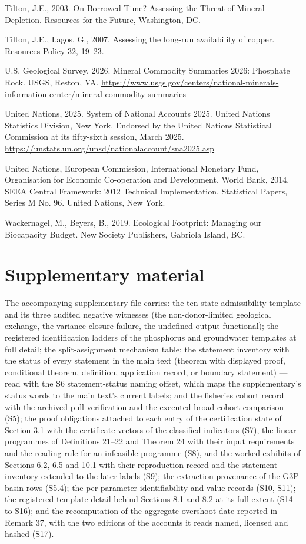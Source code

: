 \documentclass[11pt]{article}
\begin{document}
Tilton, J.E., 2003. On Borrowed Time? Assessing the Threat of Mineral Depletion. Resources for the Future, Washington, DC.

Tilton, J.E., Lagos, G., 2007. Assessing the long-run availability of copper. Resources Policy 32, 19--23.

U.S. Geological Survey, 2026. Mineral Commodity Summaries 2026: Phosphate Rock. USGS, Reston, VA. \url{https://www.usgs.gov/centers/national-minerals-information-center/mineral-commodity-summaries}

United Nations, 2025. System of National Accounts 2025. United Nations Statistics Division, New York. Endorsed by the United Nations Statistical Commission at its fifty-sixth session, March 2025. \url{https://unstats.un.org/unsd/nationalaccount/sna2025.asp}

United Nations, European Commission, International Monetary Fund, Organisation for Economic Co-operation and Development, World Bank, 2014. SEEA Central Framework: 2012 Technical Implementation. Statistical Papers, Series M No. 96. United Nations, New York.

Wackernagel, M., Beyers, B., 2019. Ecological Footprint: Managing our Biocapacity Budget. New Society Publishers, Gabriola Island, BC.

\vspace{0.8em}

\section*{Supplementary material}\label{supplementary-material}

The accompanying supplementary file carries: the ten-state admissibility template and its three audited negative witnesses (the non-donor-limited geological exchange, the variance-closure failure, the undefined output functional); the registered identification ladders of the phosphorus and groundwater templates at full detail; the split-assignment mechanism table; the statement inventory with the status of every statement in the main text (theorem with displayed proof, conditional theorem, definition, application record, or boundary statement) --- read with the S6 statement-status naming offset, which maps the supplementary's status words to the main text's current labels; and the fisheries cohort record with the archived-pull verification and the executed broad-cohort comparison (S5); the proof obligations attached to each entry of the certification state of Section 3.1 with the certificate vectors of the classified indicators (S7), the linear programmes of Definitions 21--22 and Theorem 24 with their input requirements and the reading rule for an infeasible programme (S8), and the worked exhibits of Sections 6.2, 6.5 and 10.1 with their reproduction record and the statement inventory extended to the later labels (S9); the extraction provenance of the G3P basin rows (S5.4); the per-parameter identifiability and value records (S10, S11); the registered template detail behind Sections 8.1 and 8.2 at its full extent (S14 to S16); and the recomputation of the aggregate overshoot date reported in Remark 37, with the two editions of the accounts it reads named, licensed and hashed (S17).
\end{document}
